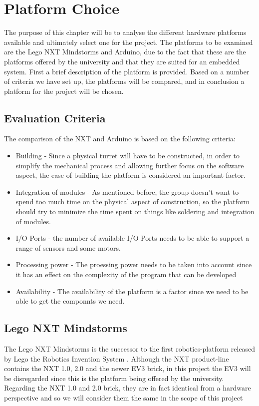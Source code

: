 \chapter{Platform Choice}\label{PlatformC}
The purpose of this chapter will be to analyse the different hardware platforms available
and ultimately select one for the project. The platforms to be examined are the
Lego NXT Mindstorms and Arduino, due to the fact that these are the
platforms offered by the university and that they are suited for an embedded
system.
First a brief description of the platform is provided. Based on a number of criteria
 we have set up, the platforms will be compared, and in conclusion a
platform for the project will be chosen.

\section{Evaluation Criteria}
The comparison of the NXT and Arduino is based on the following criteria:

\begin{itemize}
  \item Building - Since a physical turret will have to be constructed, in
  order to simplify the mechanical process and allowing further focus on the
  software aspect, the ease of building the platform is considered an important factor.
  \item Integration of modules - As mentioned before, the group doesn't want to spend too
  much time on the physical aspect of construction, so the platform should try to minimize
  the time spent on things like soldering and integration of modules.
  \item I/O Ports - the number of available I/O Ports needs to be able to
  support a range of sensors and some motors.
  \item Processing power - The proessing power needs to be taken into account
  since it has an effect on the complexity of the program that can be developed
  \item Availability - The availability of the platform is a factor since we
  need to be able to get the componnts we need.
\end{itemize}

\section{Lego NXT Mindstorms}
The Lego NXT Mindstorms is the successor to the first robotics-platform released
by Lego the Robotics Invention System \citep{NXTHistory}. Although the NXT
product-line contains the NXT 1.0, 2.0 and the newer EV3 brick, in this project
the EV3 will be disregarded since this is the platform being offered by the
university. Regarding the NXT 1.0 and 2.0 brick, they are in fact identical from
a hardware perspective and so we will consider them the same in the scope of
this project \citep{NXTversions}\nl

